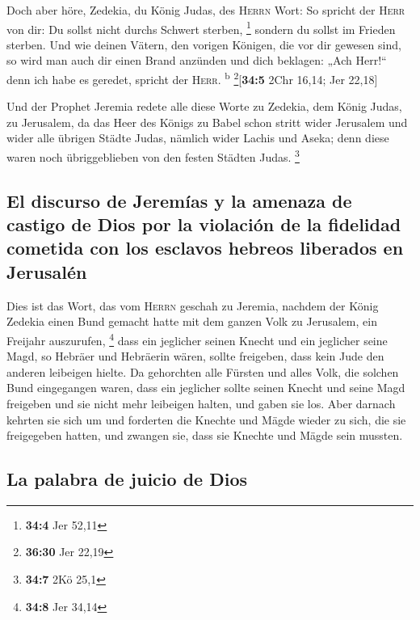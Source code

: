  Doch aber höre, Zedekia, du König Judas, des
\textsc{Herrn} Wort: So spricht der \textsc{Herr} von dir: Du sollst
nicht durchs Schwert sterben, \footnote{\textbf{34:4} Jer 52,11}
 sondern du sollst im Frieden sterben. Und wie deinen
Vätern, den vorigen Königen, die vor dir gewesen sind, so wird man auch
dir einen Brand anzünden und dich beklagen: „Ach Herr!{}`` denn ich habe
es geredet, spricht der \textsc{Herr}. \textsuperscript{b}
\footnote{\textbf{36:30} Jer 22,19}{[}\textbf{34:5} 2Chr 16,14; Jer
22,18{]}

 Und der Prophet Jeremia redete alle diese Worte zu
Zedekia, dem König Judas, zu Jerusalem,  da das Heer des
Königs zu Babel schon stritt wider Jerusalem und wider alle übrigen
Städte Judas, nämlich wider Lachis und Aseka; denn diese waren noch
übriggeblieben von den festen Städten Judas. \footnote{\textbf{34:7} 2Kö
  25,1}

\hypertarget{el-discurso-de-jeremuxedas-y-la-amenaza-de-castigo-de-dios-por-la-violaciuxf3n-de-la-fidelidad-cometida-con-los-esclavos-hebreos-liberados-en-jerusaluxe9n}{%
\subsection{El discurso de Jeremías y la amenaza de castigo de Dios por
la violación de la fidelidad cometida con los esclavos hebreos liberados
en
Jerusalén}\label{el-discurso-de-jeremuxedas-y-la-amenaza-de-castigo-de-dios-por-la-violaciuxf3n-de-la-fidelidad-cometida-con-los-esclavos-hebreos-liberados-en-jerusaluxe9n}}

 Dies ist das Wort, das vom \textsc{Herrn} geschah zu
Jeremia, nachdem der König Zedekia einen Bund gemacht hatte mit dem
ganzen Volk zu Jerusalem, ein Freijahr auszurufen, \footnote{\textbf{34:8}
  Jer 34,14}  dass ein jeglicher seinen Knecht und ein
jeglicher seine Magd, so Hebräer und Hebräerin wären, sollte freigeben,
dass kein Jude den anderen leibeigen hielte.  Da
gehorchten alle Fürsten und alles Volk, die solchen Bund eingegangen
waren, dass ein jeglicher sollte seinen Knecht und seine Magd freigeben
und sie nicht mehr leibeigen halten, und gaben sie los. 
Aber darnach kehrten sie sich um und forderten die Knechte und Mägde
wieder zu sich, die sie freigegeben hatten, und zwangen sie, dass sie
Knechte und Mägde sein mussten.

\hypertarget{la-palabra-de-juicio-de-dios}{%
\subsection{La palabra de juicio de
Dios}\label{la-palabra-de-juicio-de-dios}}

